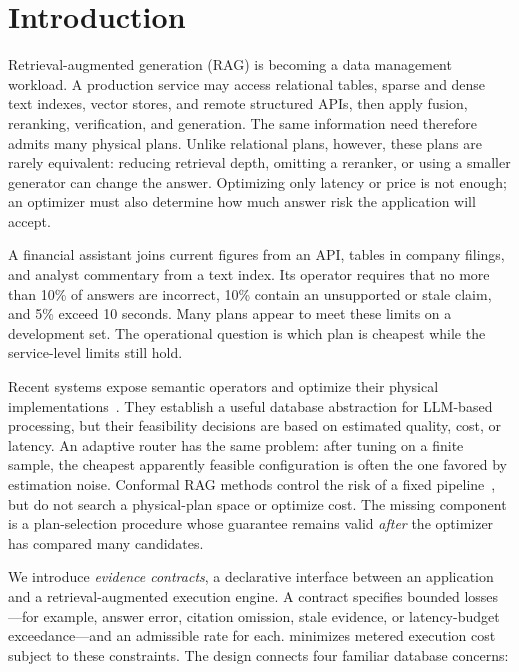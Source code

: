 \section{Introduction}
\label{sec:intro}



Retrieval-augmented generation (RAG) is becoming a data management
workload. A production service may access relational tables, sparse and
dense text indexes, vector stores, and remote structured APIs, then apply
fusion, reranking, verification, and generation. The same information need
therefore admits many physical plans. Unlike relational plans, however,
these plans are rarely equivalent: reducing retrieval depth, omitting a
reranker, or using a smaller generator can change the answer. Optimizing
only latency or price is not enough; an optimizer must also determine how
much answer risk the application will accept.

\begin{example}
\label{ex:finance}
A financial assistant joins current figures from an API, tables in company
filings, and analyst commentary from a text index. Its operator requires
that no more than 10\% of answers are incorrect, 10\% contain an
unsupported or stale claim, and 5\% exceed 10 seconds. Many plans appear to
meet these limits on a development set. The operational question is which
plan is cheapest while the service-level limits still hold.
\end{example}

Recent systems expose semantic operators and optimize their physical
implementations~\cite{liu2025palimpzest,patel2024lotus,
shankar2024docetl,russo2025abacus,chai2025quest}. They establish a useful
database abstraction for LLM-based processing, but their feasibility
decisions are based on estimated quality, cost, or latency. An adaptive
router has the same problem: after tuning on a finite sample, the cheapest
apparently feasible configuration is often the one favored by estimation
noise. Conformal RAG methods control the risk of a fixed
pipeline~\cite{li2024traq,kang2024crag}, but do not search a physical-plan
space or optimize cost. The missing component is a plan-selection procedure
whose guarantee remains valid \emph{after} the optimizer has compared many
candidates.

We introduce \emph{evidence contracts}, a declarative interface between an
application and a retrieval-augmented execution engine. A contract specifies
bounded losses---for example, answer error, citation omission, stale
evidence, or latency-budget exceedance---and an admissible rate for each.
\system minimizes metered execution cost subject to these constraints.
The design connects four familiar database concerns:

